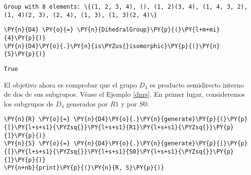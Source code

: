 \begin{enumerate}
            \begin{tcolorbox}[breakable, size=fbox, boxrule=.5pt, pad at break*=1mm, opacityfill=0]
    \begin{Verbatim}[commandchars=\\\{\}]
Group with 8 elements: \{(1, 2, 3, 4), (), (1, 2)(3, 4), (1, 4, 3, 2), (1, 4)(2, 3), (2, 4), (1, 3), (1, 3)(2, 4)\}
    \end{Verbatim}
    \end{tcolorbox}

    \begin{tcolorbox}[breakable, size=fbox, boxrule=1pt, pad at break*=1mm,colback=cellbackground, colframe=cellborder]
\begin{Verbatim}[commandchars=\\\{\}]
\PY{n}{D4} \PY{o}{=} \PY{n}{DihedralGroup}\PY{p}{(}\PY{l+m+mi}{4}\PY{p}{)}
\PY{n}{D4}\PY{o}{.}\PY{n}{is\PYZus{}isomorphic}\PY{p}{(}\PY{n}{S}\PY{p}{)}
\end{Verbatim}
\end{tcolorbox}

            \begin{tcolorbox}[breakable, size=fbox, boxrule=.5pt, pad at break*=1mm, opacityfill=0]
\begin{Verbatim}[commandchars=\\\{\}]
True
\end{Verbatim}
\end{tcolorbox}

El objetivo ahora es comprobar que el grupo $D_4$ es producto semidirecto interno de dos de sus subgrupos. Véase el Ejemplo \ref{dnrs}. En primer lugar, consideremos los subgrupos de $D_4$ generados por  $R1$  y  por $S0$:
    \begin{tcolorbox}[breakable, size=fbox, boxrule=1pt, pad at break*=1mm,colback=cellbackground, colframe=cellborder]
\begin{Verbatim}[commandchars=\\\{\}]
\PY{n}{R} \PY{o}{=} \PY{n}{D4}\PY{o}{.}\PY{n}{generate}\PY{p}{(}\PY{p}{[}\PY{l+s+s1}{\PYZsq{}}\PY{l+s+s1}{R1}\PY{l+s+s1}{\PYZsq{}}\PY{p}{]}\PY{p}{)}
\PY{n}{S} \PY{o}{=} \PY{n}{D4}\PY{o}{.}\PY{n}{generate}\PY{p}{(}\PY{p}{[}\PY{l+s+s1}{\PYZsq{}}\PY{l+s+s1}{S0}\PY{l+s+s1}{\PYZsq{}}\PY{p}{]}\PY{p}{)}
\PY{n+nb}{print}\PY{p}{(}\PY{n}{R, S}\PY{p}{)}
\end{Verbatim}
\end{tcolorbox}



\end{enumerate}
